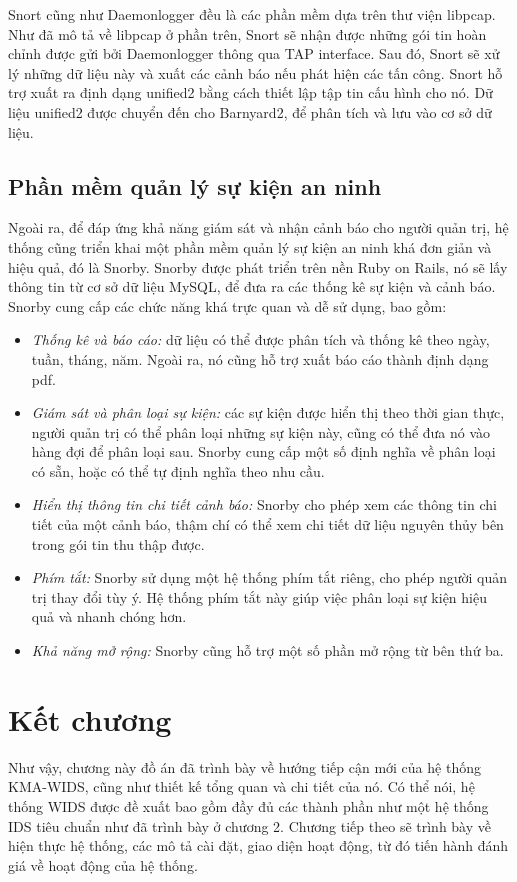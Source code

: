 
Snort cũng như Daemonlogger đều là các phần mềm dựa trên thư viện libpcap. Như đã mô tả về libpcap ở phần trên, Snort sẽ nhận được những gói tin hoàn chỉnh được gửi bởi Daemonlogger thông qua TAP interface. Sau đó, Snort sẽ xử lý những dữ liệu này và xuất các cảnh báo nếu phát hiện các tấn công. Snort hỗ trợ xuất ra định dạng unified2 bằng cách thiết lập tập tin cấu hình cho nó. Dữ liệu unified2 được chuyển đến cho Barnyard2, để phân tích và lưu vào cơ sở dữ liệu.

\subsection{Phần mềm quản lý sự kiện an ninh}
Ngoài ra, để đáp ứng khả năng giám sát và nhận cảnh báo cho người quản trị, hệ thống cũng triển khai một phần mềm quản lý sự kiện an ninh khá đơn giản và hiệu quả, đó là Snorby. Snorby được phát triển trên nền Ruby on Rails, nó sẽ lấy thông tin từ cơ sở dữ liệu MySQL, để đưa ra các thống kê sự kiện và cảnh báo. Snorby cung cấp các chức năng khá trực quan và dễ sử dụng, bao gồm:

\begin{itemize}
\item \emph{Thống kê và báo cáo:} dữ liệu có thể được phân tích và thống kê theo ngày, tuần, tháng, năm. Ngoài ra, nó cũng hỗ trợ xuất báo cáo thành định dạng pdf.
\item \emph{Giám sát và phân loại sự kiện:} các sự kiện được hiển thị theo thời gian thực, người quản trị có thể phân loại những sự kiện này, cũng có thể đưa nó vào hàng đợi để phân loại sau. Snorby cung cấp một số định nghĩa về phân loại có sẵn, hoặc có thể tự định nghĩa theo nhu cầu.
\item \emph{Hiển thị thông tin chi tiết cảnh báo:} Snorby cho phép xem các thông tin chi tiết của một cảnh báo, thậm chí có thể xem chi tiết dữ liệu nguyên thủy bên trong gói tin thu thập được.
\item \emph{Phím tắt:} Snorby sử dụng một hệ thống phím tắt riêng, cho phép người quản trị thay đổi tùy ý. Hệ thống phím tắt này giúp việc phân loại sự kiện hiệu quả và nhanh chóng hơn.
\item \emph{Khả năng mở rộng:} Snorby cũng hỗ trợ một số phần mở rộng từ bên thứ ba.
\end{itemize}


\section{Kết chương}
Như vậy, chương này đồ án đã trình bày về hướng tiếp cận mới của hệ thống KMA-WIDS, cũng như thiết kế tổng quan và chi tiết của nó. Có thể nói, hệ thống WIDS được đề xuất bao gồm đầy đủ các thành phần như một hệ thống IDS tiêu chuẩn như đã trình bày ở chương 2. Chương tiếp theo sẽ trình bày về hiện thực hệ thống, các mô tả cài đặt, giao diện hoạt động, từ đó tiến hành đánh giá về hoạt động của hệ thống.
